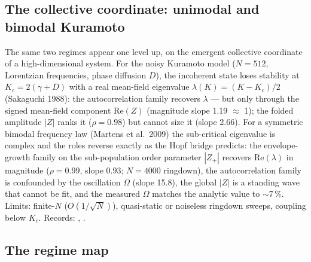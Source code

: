 \documentclass[aip,cha,preprint,amsmath,amssymb]{revtex4-2}
\begin{document}
\subsection{The collective coordinate: unimodal and bimodal Kuramoto}\label{sec:kuramoto}

The same two regimes appear one level up, on the emergent collective
coordinate of a high-dimensional system. For the noisy Kuramoto model
($N = 512$, Lorentzian frequencies, phase diffusion $D$), the
incoherent state loses stability at $K_c = 2(\gamma + D)$ with a real
mean-field eigenvalue $\lambda(K) = (K - K_c)/2$ (Sakaguchi 1988): the
autocorrelation family recovers $\lambda$ --- but only through the
signed mean-field component $\mathrm{Re}(Z)$ (magnitude slope 1.19
$\approx$ 1); the folded amplitude $|Z|$ ranks it ($\rho = 0.98$) but
cannot size it (slope 2.66). For a symmetric bimodal frequency law
(Martens et al.\ 2009) the sub-critical eigenvalue is complex and the
roles reverse exactly as the Hopf bridge predicts: the envelope-growth
family on the sub-population order parameter $|Z_+|$ recovers
$\mathrm{Re}(\lambda)$ in magnitude ($\rho = 0.99$, slope 0.93;
$N = 4000$ ringdown), the autocorrelation family is confounded by the
oscillation $\Omega$ (slope 15.8), the global $|Z|$ is a standing wave
that cannot be fit, and the measured $\Omega$ matches the analytic
value to $\sim$7\,\%. Limits: finite-$N$ ($O(1/\sqrt{N})$),
quasi-static or noiseless ringdown sweeps, coupling below $K_c$.
Records:
,
.

\subsection{The regime map}\label{sec:regimemap}
\end{document}
